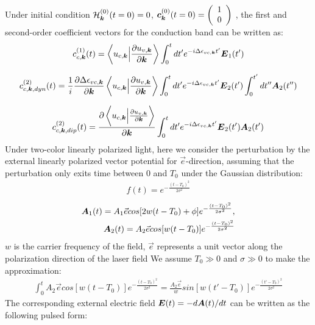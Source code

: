 Under initial condition $\mathcal{H}^{(0)}_{\boldsymbol k}(t=0)=0$, $\boldsymbol c^{(0)}_{\boldsymbol k}(t=0) = \left(
    \begin{array}{cc}
      1\\
     0
    \end{array}
    \right)$ ,  the first and second-order coefficient vectors for the conduction band can be written as:
\begin{align}
     c^{(1)}_{c,\boldsymbol k}(t) = \left \langle u_{c,\boldsymbol k}\Big |\frac{\partial u_{v,\boldsymbol k}}{\partial \boldsymbol k} \right \rangle \int_0^t dt' e^{-i \Delta \epsilon_{vc,\boldsymbol k}t'} 
      \boldsymbol E_1(t') 
\label{first_P}
\end{align}

\begin{align}
     c^{(2)}_{c,\boldsymbol k,dyn}(t) = \frac{1}{i} \frac{\partial  \Delta \epsilon_{vc,\boldsymbol k}}{\partial \boldsymbol k} \left \langle u_{c,\boldsymbol k}\Big |\frac{\partial u_{v,\boldsymbol k}}{\partial \boldsymbol k} \right \rangle \int_0^t dt' e^{-i \Delta \epsilon_{vc,\boldsymbol k}t'}\boldsymbol E_2(t') \int_0^{t'}  
    dt'' \boldsymbol A_2(t'') 
    \label{second_dyn}
\end{align}

\begin{align}
     c^{(2)}_{c,\boldsymbol k,dip}(t) =  \frac{\partial \left \langle u_{c,\boldsymbol k}\Big |\frac{\partial u_{v,\boldsymbol k}}{\partial \boldsymbol k} \right \rangle}{\partial \boldsymbol k}   \int_0^t dt' e^{-i \Delta \epsilon_{vc,\boldsymbol k}t'}\boldsymbol E_2(t')  \boldsymbol A_2(t') 
    \label{second_dip}
\end{align}
Under two-color linearly polarized light, here we consider the perturbation by the external linearly polarized vector potential for $\vec e$-direction, assuming that the perturbation only exits time between 0 and $T_0$ under the Gaussian distribution:
\begin{align}
f(t)=e^{-\frac{(t-T_0)^2}{2\sigma^2}}    
\end{align}
\begin{align}
   \boldsymbol A_1(t)=A_1 \vec e cos[2w(t-T_0)+\phi]  e^{-\frac{(t-T_0)^2}{2\sigma^2}}, \\
   \boldsymbol A_2(t)=A_2 \vec e cos[w(t-T_0)]  e^{-\frac{(t-T_0)^2}{2\sigma^2}}
   \label{vector}
\end{align}
$w$ is the carrier frequency of the field,  $\vec{e}$ represents a unit vector along the polarization direction of the laser field
We assume $T_0\gg0$ and $\sigma\gg0$ to make the approximation:
\begin{align}
\int_0^t A_2 \vec e cos[w(t-T_0)]  e^{-\frac{(t-T_0)^2}{2\sigma^2}}=\frac{A_2 \vec e}{w} sin[w(t'-T_0)]  e^{-\frac{(t'-T_0)^2}{2\sigma^2}}    
\end{align}
The corresponding external electric field $\boldsymbol E(t)=-d\boldsymbol A(t)/dt$ can be written as the following pulsed form:

